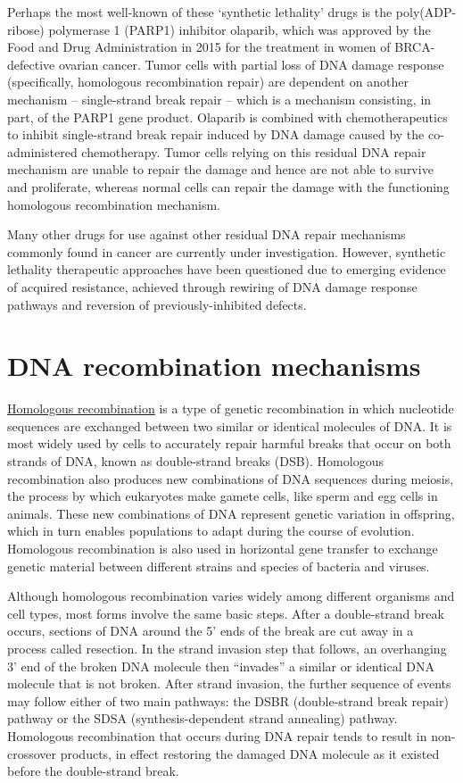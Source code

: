 Perhaps the most well-known of these `synthetic lethality' drugs is the poly(ADP-ribose) polymerase 1 (PARP1) inhibitor olaparib, which was approved by the Food and Drug Administration in 2015 for the treatment in women of BRCA-defective ovarian cancer. Tumor cells with partial loss of DNA damage response (specifically, homologous recombination repair) are dependent on another mechanism -- single-strand break repair -- which is a mechanism consisting, in part, of the PARP1 gene product. Olaparib is combined with chemotherapeutics to inhibit single-strand break repair induced by DNA damage caused by the co-administered chemotherapy. Tumor cells relying on this residual DNA repair mechanism are unable to repair the damage and hence are not able to survive and proliferate, whereas normal cells can repair the damage with the functioning homologous recombination mechanism.

Many other drugs for use against other residual DNA repair mechanisms commonly found in cancer are currently under investigation. However, synthetic lethality therapeutic approaches have been questioned due to emerging evidence of acquired resistance, achieved through rewiring of DNA damage response pathways and reversion of previously-inhibited defects.

\hypertarget{dna-recombination-mechanisms}{%
\section{DNA recombination mechanisms}\label{dna-recombination-mechanisms}}

\href{https://en.wikipedia.org/wiki/Homologous_recombination}{Homologous recombination} is a type of genetic recombination in which nucleotide sequences are exchanged between two similar or identical molecules of DNA. It is most widely used by cells to accurately repair harmful breaks that occur on both strands of DNA, known as double-strand breaks (DSB). Homologous recombination also produces new combinations of DNA sequences during meiosis, the process by which eukaryotes make gamete cells, like sperm and egg cells in animals. These new combinations of DNA represent genetic variation in offspring, which in turn enables populations to adapt during the course of evolution. Homologous recombination is also used in horizontal gene transfer to exchange genetic material between different strains and species of bacteria and viruses.

Although homologous recombination varies widely among different organisms and cell types, most forms involve the same basic steps. After a double-strand break occurs, sections of DNA around the 5' ends of the break are cut away in a process called resection. In the strand invasion step that follows, an overhanging 3' end of the broken DNA molecule then ``invades'' a similar or identical DNA molecule that is not broken. After strand invasion, the further sequence of events may follow either of two main pathways: the DSBR (double-strand break repair) pathway or the SDSA (synthesis-dependent strand annealing) pathway. Homologous recombination that occurs during DNA repair tends to result in non-crossover products, in effect restoring the damaged DNA molecule as it existed before the double-strand break.

